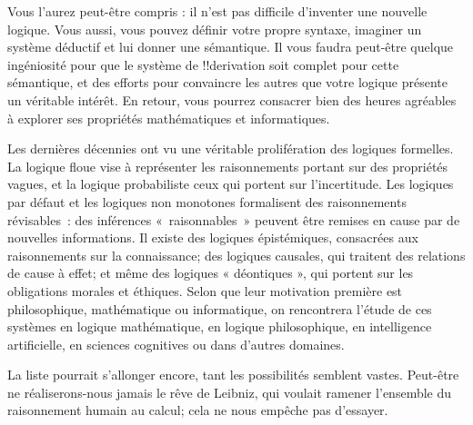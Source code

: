 \documentclass[../../../include/open-logic-section]{subfiles}
\begin{document}


Vous l'aurez peut-être compris : il n'est pas difficile d'inventer
une nouvelle logique. Vous aussi, vous pouvez définir votre propre
syntaxe, imaginer un système déductif et lui donner une sémantique.
Il vous faudra peut-être quelque ingéniosité pour que le système de
!!{derivation} soit complet pour cette sémantique, et des efforts
pour convaincre les autres que votre logique présente un véritable
intérêt. En retour, vous pourrez consacrer bien des heures
agréables à explorer ses propriétés mathématiques et informatiques.

Les dernières décennies ont vu une véritable prolifération des
logiques formelles. La logique floue vise à représenter les
raisonnements portant sur des propriétés vagues, et la logique
probabiliste ceux qui portent sur l'incertitude. Les logiques
par défaut et les logiques non monotones formalisent des raisonnements
révisables~: des inférences «~raisonnables~» peuvent être remises en cause
par de nouvelles informations. Il existe des logiques épistémiques,
consacrées aux raisonnements sur la connaissance; des logiques
causales, qui traitent des relations de cause à effet; et même
des logiques « déontiques », qui portent sur les obligations
morales et éthiques. Selon que leur motivation première est
philosophique, mathématique ou informatique, on rencontrera
l'étude de ces systèmes en logique mathématique, en logique
philosophique, en intelligence artificielle, en sciences
cognitives ou dans d'autres domaines.

La liste pourrait s'allonger encore, tant les possibilités
semblent vastes. Peut-être ne réaliserons-nous jamais le rêve
de Leibniz, qui voulait ramener l'ensemble du raisonnement
humain au calcul; cela ne nous empêche pas d'essayer.
\end{document}
